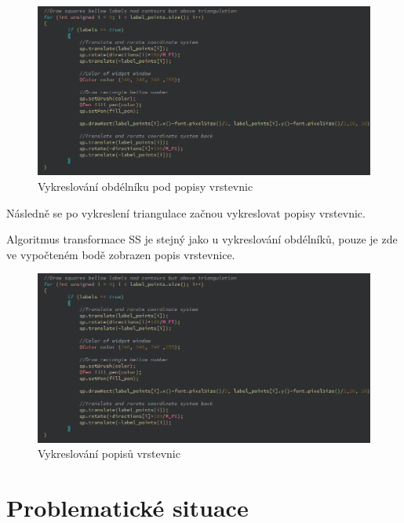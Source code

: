 \documentclass[11pt]{article}
\begin{document}
\begin{figure}[htbh]
	\centering
	\includegraphics[scale=0.5]{images/DrawLabelSquares.png} 
	\caption{Vykreslování obdélníku pod popisy vrstevnic}
	\label{fig:DrawLabelSquares}
\end{figure} 

Následně se po vykreslení triangulace začnou vykreslovat popisy vrstevnic. 

Algoritmus transformace SS je stejný jako u vykreslování obdélníků, pouze je zde ve vypočteném bodě zobrazen popis vrstevnice.

\begin{figure}[htbh]
	\centering
	\includegraphics[scale=0.5]{images/DrawLabelSquares.png} 
	\caption{Vykreslování popisů vrstevnic}
	\label{fig:DrawLabels}
\end{figure}

\clearpage

\section{Problematické situace}
	
\end{document}
